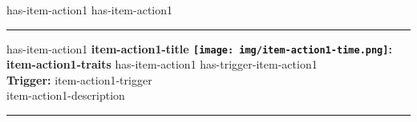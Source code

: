 \documentclass{article}
\begin{document}
        has-item-action1 \vspace{1.5mm}
        has-item-action1 \rule{\textwidth}{0.5pt}
        has-item-action1 \textbf{item-action1-title \texttt{[image: img/item-action1-time.png]}: item-action1-traits}  
        has-item-action1 has-trigger-item-action1 \\ \textbf{Trigger:} item-action1-trigger\\
        item-action1-description
        
        \vspace{1.5mm}
        \rule{\textwidth}{0.5pt}

    \endgroup
\end{document}
